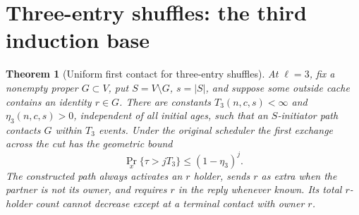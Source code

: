 \documentclass[11pt]{article}
\newtheorem{theorem}{Theorem}
\begin{document}
\section{Three-entry shuffles: the third induction base}

\begin{theorem}[Uniform first contact for three-entry shuffles]
\label{thm:threefirstcontact}
At $\ell=3$, fix a nonempty proper
$G\subset V$, put $S=V\setminus G$, $s=|S|$, and
suppose some outside cache contains an identity $r\in G$.
There are constants $T_3(n,c,s)<\infty$ and
$\eta_3(n,c,s)>0$, independent of all initial ages,
such that an $S$-initiator path contacts $G$ within $T_3$
events. Under the original scheduler the first exchange
across the cut has the geometric bound
\[
 \Pr_x\{\tau>jT_3\}\le(1-\eta_3)^j.
\]
The constructed path always activates an $r$ holder,
sends $r$ as extra when the partner is not its owner,
and requires $r$ in the reply whenever known. Its total
$r$-holder count cannot decrease except at a terminal
contact with owner $r$.
\end{theorem}
\end{document}
